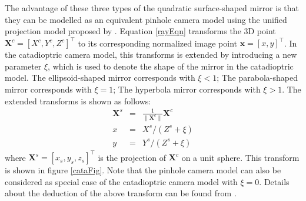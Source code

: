 \documentclass{report}
\begin{document}
\bigskip 
The advantage of these three types of the quadratic surface-shaped mirror is that they can be modelled as an equivalent pinhole camera model using the unified projection model proposed by \cite{geyer2000unifying}. Equation \ref{rayEqn} transforms the 3D point $\mathbf{X}^c = [X^c, Y^c, Z^c]^\top$ to its corresponding normalized image point $\mathbf{x} = [x, y]^\top$. In the catadioptric camera model, this transforms is extended by introducing a new parameter $\xi$, which is used to denote the shape of the mirror in the catadioptric model. The ellipsoid-shaped mirror corresponds with $\xi < 1$; The parabola-shaped mirror corresponds with $\xi = 1$; The hyperbola mirror corresponds with $\xi > 1$. The extended transforms is shown as follows: 
\begin{eqnarray}
\mathbf{X}^s &=&
\frac{1}{\| \mathbf{X}^c \|} \mathbf{X}^c \\
x &=& X^s / (Z^s + \xi) \label{liftEqn1}\\
y &=& Y^s / (Z^s + \xi) \label{liftEqn2}
\end{eqnarray}
where $\mathbf{X}^s = [x_s, y_s, z_s]^\top$ is the projection of $\mathbf{X}^c$ on a unit sphere. This transform is shown in figure \ref{cataFig}. Note that the pinhole camera model can also be considered as  special case of the catadioptric camera model with $\xi = 0$. Details about the deduction of the above transform can be found from \cite{geyer2000unifying}. 
\end{document}
